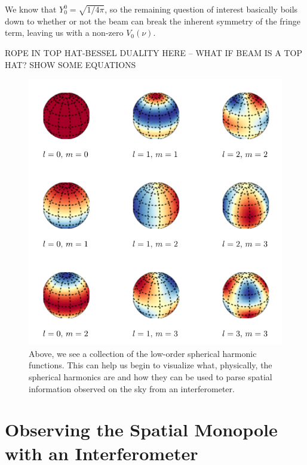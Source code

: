We know that $Y_0^0 = \sqrt{1/4\pi}$, so the remaining question of interest 
basically boils down to whether or not the beam can break the inherent symmetry 
of the fringe term, leaving us with a non-zero $V_0(\nu)$.

ROPE IN TOP HAT-BESSEL DUALITY HERE -- WHAT IF BEAM IS A TOP HAT? SHOW SOME 
EQUATIONS

\begin{figure}
    \begin{center}
    \includegraphics[width=\linewidth]{spherical_harmonics}
    \end{center}
    \caption{
         Above, we see a collection of the low-order spherical harmonic 
         functions. This can help us begin to visualize what, physically, the 
         spherical harmonics are and how they can be used to parse spatial 
         information observed on the sky from an interferometer.
    }
    \label{fig:spherical-harmonics}
\end{figure}

\section{Observing the Spatial Monopole with an Interferometer}
\label{sec:observing-monopole}

